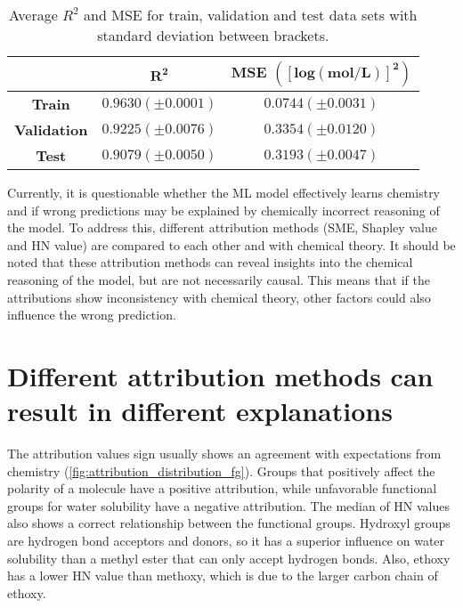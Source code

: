\begin{table}[h]
    \centering
    \caption{Average $R^2$ and MSE for train, validation and test data sets with standard deviation between brackets.}
    \label{tab:model_performance}
    \begin{tabular}{ccc}
        \toprule 
       & $\pmb{R^2}$ & \textbf{MSE $\pmb{\left(\left[log(mol/L)\right]^2\right)}$} \\
        \midrule
        \textbf{Train} & $0.9630 (\pm 0.0001)$ & $0.0744 (\pm 0.0031)$ \\
        \textbf{Validation} & $0.9225 (\pm 0.0076)$ & $0.3354 (\pm 0.0120)$ \\
        \textbf{Test} & $0.9079 (\pm 0.0050)$ & $0.3193 (\pm 0.0047)$ \\
        \bottomrule 
    \end{tabular}
\end{table}



Currently, it is questionable whether the ML model effectively learns chemistry and 
if wrong predictions may be explained by chemically incorrect reasoning of the model. 
To address this, different attribution methods (SME, Shapley value and HN value) are 
compared to each other and with chemical theory. It should be noted that these attribution 
methods can reveal insights into the chemical reasoning of the model, but are not necessarily 
causal. This means that if the attributions show inconsistency with chemical theory, other 
factors could also influence the wrong prediction.


\section{Different attribution methods can result in different explanations}
\label{sec:results_different_explanations}


The attribution values sign usually shows an agreement with expectations from 
chemistry (\cref{fig:attribution_distribution_fg}). Groups that positively affect the polarity of a molecule have a 
positive attribution, while unfavorable functional groups for water solubility 
have a negative attribution. The median of HN values also shows a correct 
relationship between the functional groups. Hydroxyl groups are hydrogen bond 
acceptors and donors, so it has a superior influence on water solubility than 
a methyl ester that can only accept hydrogen bonds. Also, ethoxy has a lower 
HN value than methoxy, which is due to the larger carbon chain of ethoxy.


